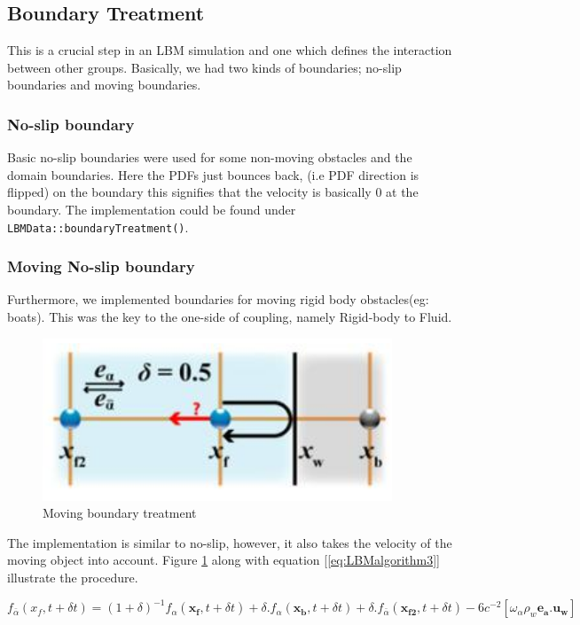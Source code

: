 \subsection *{Boundary Treatment}
This is a crucial step in an LBM simulation and one which defines the interaction
between other groups. Basically, we had two kinds of boundaries; no-slip boundaries and moving boundaries. 
\subsubsection *{No-slip boundary}
  Basic no-slip boundaries were used for some non-moving obstacles and the domain boundaries. Here the PDFs just bounces back, (i.e PDF direction is flipped) on the boundary this signifies that the velocity is basically 0 at the boundary. The implementation could be found under \texttt{LBMData::boundaryTreatment()}.


\subsubsection *{Moving No-slip boundary}
Furthermore, we implemented boundaries for moving rigid body obstacles(eg: boats). This was the key to the one-side of coupling, namely Rigid-body to Fluid. 
\begin{figure}[ht]
	\centering
	\includegraphics[scale=0.5]{img/LBM/moving_boundary.png}
	\caption{Moving boundary treatment}
	\label{fig: Moving boundary}
\end{figure} 
 The implementation is similar to no-slip, however, it also takes the velocity of the moving object into account. Figure \ref{fig: Moving boundary} along with equation [\ref{eq:LBMalgorithm3}] illustrate the procedure. 

	 \begin{equation}
	 \label{eq:LBMalgorithm3}
	f_{\bar{\alpha}}(x_f , t + \delta t) = (1+\delta)^{-1} f_\alpha(\boldsymbol{x_f}, t+\delta t)
	+ \delta.f_\alpha(\boldsymbol{x_b}, t+\delta t) + \delta . f_{\bar{\alpha}}(\boldsymbol{x_{f2}}, t+\delta t) - 6c^{-2}[\omega_{\alpha}\rho_w \boldsymbol{e_a.u_w}]
	\end{equation}


